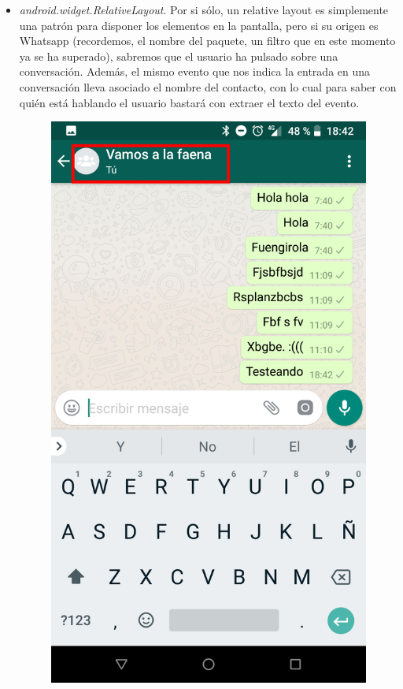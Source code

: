 \documentclass[12pt,a4paper,oneside]{book} %
\begin{document}
\begin{itemize}
\item \textit{android.widget.RelativeLayout}. Por si sólo, un relative layout es simplemente una patrón para disponer los elementos en la pantalla, pero si su origen es Whatsapp (recordemos, el nombre del paquete, un filtro que en este momento ya se ha superado), sabremos que el usuario ha pulsado sobre una conversación. 
\newline \newline 
Además, el mismo evento que nos indica la entrada en una conversación lleva asociado el nombre del contacto, con lo cual para saber con quién está hablando el usuario bastará con extraer el texto del evento. 
\begin{figure}[H]
	\begin{center}
     	\includegraphics[scale=0.2]{pictures/IRL/whatsapp/whatsapp_layout.png}

\end{center}
\end{figure}
\end{itemize}
\end{document}

